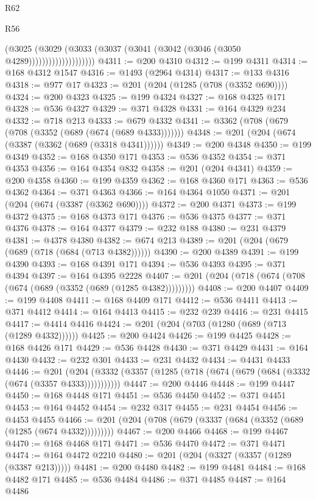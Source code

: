 \begin{lexlean}{R62}
\begin{lexlean}{R56}
\begin{coremodule}
{{{{{{{{{{{{{{{{{{{{{{{{{{{{{{{{{{{{{{{{{{{{{{{{{{{{{{{{{{{{{{{{{{{{{{{{{{{{{{{{{{{{{{{{{{{{{{{{{{{{{{{{{{{{{{{{{{{{{{{{{{{{{{{{{{{{{{{{{{{{{{{{{{{{{{{{{{{{{{{{{{{{{{{{{{{{{{{{{{{{{{{{{{{{{{{{{{{{{{{{{{{{{{{{{{{                            (@3025
                              (@3029
                                (@3033 (@3037 (@3041 (@3042 (@3046 (@3050 @4289))))))))))))))))))))
@4311 := @200 @4310
@4312 := @199 @4311
@4314 := @168 @4312 @1547
@4316 := @1493 (@2964 @4314)
@4317 := @133 @4316
@4318 := @977 @17
@4323 := @201 (@204 (@1285 (@708 (@3352 @690))))
@4324 := @200 @4323
@4325 := @199 @4324
@4327 := @168 @4325 @171
@4328 := @536 @4327
@4329 := @371 @4328
@4331 := @164 @4329 @234
@4332 := @718 @213
@4333 := @679 @4332
@4341 := @3362 (@708 (@679 (@708 (@3352 (@689 (@674 (@689 @4333)))))))
@4348 := @201 (@204 (@674 (@3387 (@3362 (@689 (@3318 @4341))))))
@4349 := @200 @4348
@4350 := @199 @4349
@4352 := @168 @4350 @171
@4353 := @536 @4352
@4354 := @371 @4353
@4356 := @164 @4354 @832
@4358 := @201 (@204 @4341)
@4359 := @200 @4358
@4360 := @199 @4359
@4362 := @168 @4360 @171
@4363 := @536 @4362
@4364 := @371 @4363
@4366 := @164 @4364 @1050
@4371 := @201 (@204 (@674 (@3387 (@3362 @690))))
@4372 := @200 @4371
@4373 := @199 @4372
@4375 := @168 @4373 @171
@4376 := @536 @4375
@4377 := @371 @4376
@4378 := @164 @4377
@4379 := @232 @188
@4380 := @231 @4379
@4381 := @4378 @4380
@4382 := @674 @213
@4389 := @201 (@204 (@679 (@689 (@718 (@684 (@713 @4382))))))
@4390 := @200 @4389
@4391 := @199 @4390
@4393 := @168 @4391 @171
@4394 := @536 @4393
@4395 := @371 @4394
@4397 := @164 @4395 @2228
@4407 := @201 (@204 (@718 (@674 (@708 (@674 (@689 (@3352 (@689 (@1285 @4382)))))))))
@4408 := @200 @4407
@4409 := @199 @4408
@4411 := @168 @4409 @171
@4412 := @536 @4411
@4413 := @371 @4412
@4414 := @164 @4413
@4415 := @232 @239
@4416 := @231 @4415
@4417 := @4414 @4416
@4424 := @201 (@204 (@703 (@1280 (@689 (@713 (@1289 @4332))))))
@4425 := @200 @4424
@4426 := @199 @4425
@4428 := @168 @4426 @171
@4429 := @536 @4428
@4430 := @371 @4429
@4431 := @164 @4430
@4432 := @232 @301
@4433 := @231 @4432
@4434 := @4431 @4433
@4446 := @201
    (@204 (@3332 (@3357 (@1285 (@718 (@674 (@679 (@684 (@3332 (@674 (@3357 @4333)))))))))))
@4447 := @200 @4446
@4448 := @199 @4447
@4450 := @168 @4448 @171
@4451 := @536 @4450
@4452 := @371 @4451
@4453 := @164 @4452
@4454 := @232 @317
@4455 := @231 @4454
@4456 := @4453 @4455
@4466 := @201 (@204 (@708 (@679 (@3337 (@684 (@3352 (@689 (@1285 (@674 @4332)))))))))
@4467 := @200 @4466
@4468 := @199 @4467
@4470 := @168 @4468 @171
@4471 := @536 @4470
@4472 := @371 @4471
@4474 := @164 @4472 @2210
@4480 := @201 (@204 (@3327 (@3357 (@1289 (@3387 @213)))))
@4481 := @200 @4480
@4482 := @199 @4481
@4484 := @168 @4482 @171
@4485 := @536 @4484
@4486 := @371 @4485
@4487 := @164 @4486
}}}}}}}}}}}}}}}}}}}}}}}}}}}}}}}}}}}}}}}}}}}}}}}}}}}}}}}}}}}}}}}}}}}}}}}}}}}}}}}}}}}}}}}}}}}}}}}}}}}}}}}}}}}}}}}}}}}}}}}}}}}}}}}}}}}}}}}}}}}}}}}}}}}}}}}}}}}}}}}}}}}}}}}}}}}}}}}}}}}}}}}}}}}}}}}}}}}}}}}}}}}}}}}}}}}
\end{coremodule}
\end{lexlean}
\end{lexlean}
